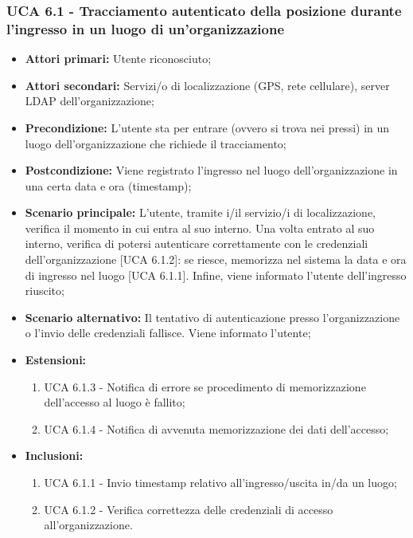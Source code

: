 \subsubsection{UCA 6.1 - Tracciamento autenticato della posizione durante l'ingresso in un luogo di un'organizzazione}%
\begin{itemize}
	\item \textbf{Attori primari:} Utente riconosciuto;
	\item \textbf{Attori secondari:} Servizi/o di localizzazione (GPS, rete cellulare), server LDAP dell'organizzazione;
	\item \textbf{Precondizione:} L'utente sta per entrare (ovvero si trova nei pressi) in un luogo dell'organizzazione che richiede il tracciamento;
	\item \textbf{Postcondizione:} Viene registrato l'ingresso nel luogo dell'organizzazione in una certa data e ora (timestamp);
	\item \textbf{Scenario principale:} L'utente, tramite i/il servizio/i di localizzazione, verifica il momento in cui entra al suo interno. Una volta entrato al suo interno, verifica di potersi autenticare correttamente con le credenziali dell'organizzazione [UCA 6.1.2]: se riesce, memorizza nel sistema la data e ora di ingresso nel luogo [UCA 6.1.1]. Infine, viene informato l'utente dell'ingresso riuscito;
	\item \textbf{Scenario alternativo:} Il tentativo di autenticazione presso l'organizzazione o l'invio delle credenziali fallisce. Viene informato l'utente;
	\item \textbf{Estensioni:}
	\begin{enumerate}
		\item UCA 6.1.3 - Notifica di errore se procedimento di memorizzazione dell'accesso al luogo è fallito;
		\item UCA 6.1.4 - Notifica di avvenuta memorizzazione dei dati dell'accesso;
	\end{enumerate}
	\item \textbf{Inclusioni:}
	\begin{enumerate}
		\item UCA 6.1.1 - Invio timestamp relativo all'ingresso/uscita in/da un luogo;
		\item UCA 6.1.2 - Verifica correttezza delle credenziali di accesso all'organizzazione.
	\end{enumerate}
\end{itemize}


